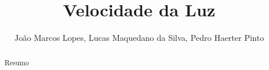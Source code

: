 \documentclass[a4paper,10pt]{report}
\author{João Marcos Lopes, Lucas Maquedano da Silva, Pedro Haerter Pinto}
\title{Velocidade da Luz}
\begin{document}
\maketitle
\tableofcontents

\begin{abstract}
Resumo
\end{abstract}
\end{document}
